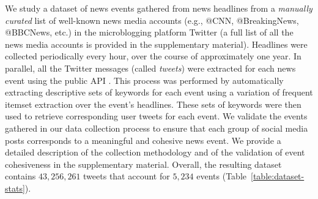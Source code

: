 
We study a dataset of news events gathered from news
headlines from a \emph{manually curated} list of well-known news media
accounts (e.g., @CNN, @BreakingNews, @BBCNews, etc.) in the
microblogging platform Twitter \cite{Twitter_website}
(a full list of all the news media
accounts is provided in the supplementary material). Headlines were
collected periodically every hour, over the course of approximately
one year. In parallel, all the Twitter messages (called \emph{tweets})
were extracted for each news event using the public
API \cite{Twitter_API}.
This process was performed by automatically extracting descriptive
sets of keywords for each event using a variation of frequent itemset
extraction \cite{Tan_Steinbach_Kumar} over the event's headlines.
These sets of keywords were then used to retrieve corresponding user
tweets for each event. We validate the events gathered in our
data collection process to ensure that each group of social media
posts corresponds to a meaningful and cohesive news event. We provide a detailed
description of the collection methodology and of the validation of event
cohesiveness in the supplementary material. Overall, the resulting dataset contains
$43,256,261$ tweets that account for $5,234$ events (Table~\ref{table:dataset-stats}).

